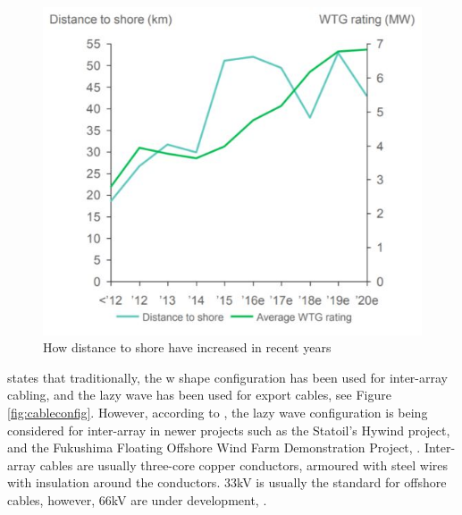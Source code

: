 \begin{figure}[H]
\centering
\includegraphics[scale=0.9]{figures/distshore}
\caption[$\; \:$Distance to shore ]{How distance to shore have increased in recent years \cite{Make2016}}
 \label{fig:distshore}
\end{figure}

\noindent \cite{srinil2016} states that traditionally, the w shape configuration has been used for inter-array cabling, and the lazy wave has been used for export cables, see Figure \ref{fig:cableconfig}. However, according to \cite{ds2010}, the lazy wave configuration is being considered for inter-array in newer projects such as the Statoil's Hywind project, and the Fukushima Floating Offshore Wind
Farm Demonstration Project, \cite{yagihashi2015dynamic}. Inter-array cables are usually three-core copper conductors, armoured with steel wires with insulation around the conductors. 33kV is usually the standard for offshore cables, however, 66kV are under development, \cite{srinil2016}. 


